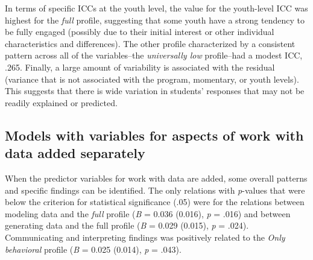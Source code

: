 \documentclass[]{msu-thesis}
\theoremstyle{definition}
\theoremstyle{definition}
\theoremstyle{definition}
\theoremstyle{remark}
\begin{document}
In terms of specific ICCs at the youth level, the value for the
youth-level ICC was highest for the \emph{full} profile, suggesting that
some youth have a strong tendency to be fully engaged (possibly due to
their initial interest or other individual characteristics and
differences). The other profile characterized by a consistent pattern
across all of the variables--the \emph{universally low} profile--had a
modest ICC, .265. Finally, a large amount of variability is associated
with the residual (variance that is not associated with the program,
momentary, or youth levels). This suggests that there is wide variation
in students' responses that may not be readily explained or predicted.

\subsection{Models with variables for aspects of work with data added
separately}\label{models-with-variables-for-aspects-of-work-with-data-added-separately}

When the predictor variables for work with data are added, some overall
patterns and specific findings can be identified. The only relations
with \emph{p}-values that were below the criterion for statistical
significance (.05) were for the relations between modeling data and the
\emph{full} profile (\emph{B} = 0.036 (0.016), \emph{p} = .016) and
between generating data and the full profile (\emph{B} = 0.029 (0.015),
\emph{p} = .024). Communicating and interpreting findings was positively
related to the \emph{Only behavioral} profile (\emph{B} = 0.025 (0.014),
\emph{p} = .043).
\end{document}
